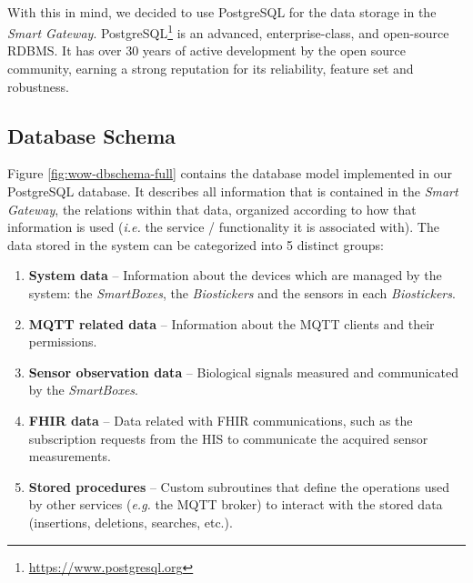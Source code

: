 \paragraph{} With this in mind, we decided to use PostgreSQL for the data storage in the \textit{Smart Gateway}. PostgreSQL\footnote{\url{https://www.postgresql.org}} is an advanced, enterprise-class, and open-source \acs{RDBMS}. It has over 30 years of active development by the open source community, earning a strong reputation for its reliability, feature set and robustness.

\subsection{Database Schema}
Figure \ref{fig:wow-dbschema-full} contains the database model implemented in our PostgreSQL database. It describes all information that is contained in the \textit{Smart Gateway}, the relations within that data, organized according to how that information is used (\textit{i.e.} the service / functionality it is associated with). The data stored in the system can be categorized into 5 distinct groups:

\begin{enumerate}
    \item \textbf{System data} -- Information about the devices which are managed by the system: the \textit{SmartBoxes}, the \textit{Biostickers} and the sensors in each \textit{Biostickers}. 
    \item \textbf{\acs{MQTT} related data} -- Information about the \acs{MQTT} clients and their permissions. 
    \item \textbf{Sensor observation data} -- Biological signals measured and communicated by the \textit{SmartBoxes}.
    \item \textbf{\acs{FHIR} data} -- Data related with \acs{FHIR} communications, such as the subscription requests from the \acs{HIS} to communicate the acquired sensor measurements.
    \item \textbf{Stored procedures} -- Custom subroutines that define the operations used by other services (\textit{e.g.} the \acs{MQTT} broker) to interact with the stored data (insertions, deletions, searches, etc.).
\end{enumerate}

\clearpage 

